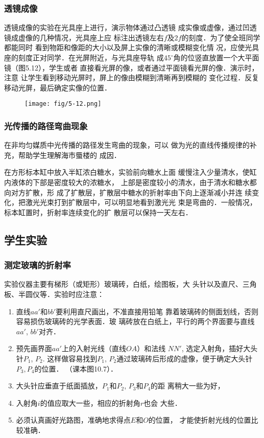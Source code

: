 \subsubsection{透镜成像}
透镜成像的实验在光具座上进行，演示物体通过凸透镜
成实像或虚像，通过凹透镜成虚像的几种情况，光具座上应
标注出透镜左右$f$及$2f$的刻度．为了使全班同学都能同时
看到物距和像距的大小以及屏上实像的清晰或模糊变化情
况，应使光具座的刻度正对同学．在光屏附近，与光具座导轨
成$45^{\circ}$角的位竖直放置一个大平面镜（图5.12），学生或者
直接看光屏的像，或者通过平面镜看光屏的像．演示时，注意
让学生看到移动光屏时，屏上的像由模糊到清晰再到模糊的
变化过程．反复移动光屏，最后确定实像的位置．
\begin{figure}[htp]
    \centering
    \texttt{[image: fig/5-12.png]}
    \caption{}
\end{figure}

\subsubsection{光传播的路径弯曲现象}

在非均匀媒质中光传播的路径发生弯曲的现象，可以
做为光的直线传播规律的补充，帮助学生理解海市蜃楼的
成因．

在方形标本缸中放入半缸浓白糖水，实验前向糖水上面
缓慢注入少量清水，使缸内液体的下部是密度较大的浓糖水，
上部是密度较小的清水，由于清水和糖水都向对方扩散，形
成了扩散层，扩散层中糖水的折射率由下向上逐渐减小并连
续变化，把激光光束打到扩散层中，可以明显地看到激光光
束是弯曲的．一般情况，标本缸置时，折射率连续变化的扩
散层可以保持一天左右．

\subsection{学生实验}
\subsubsection{测定玻璃的折射率}
实验仪器主要有梯形（或矩形）玻璃砖，白纸，绘图板，大
头针以及直尺、三角板、半圆仪等．实验时应注意：
\begin{enumerate}
\item 直线$aa'$和$bb'$要利用直尺画出，不准直接用铅笔
靠着玻璃砖的侧面划线，否则容易损伤玻璃砖的光学表面．玻
璃砖放在白纸上，平行的两个界面要与直线$aa'$, $bb'$对齐．
\item 预先画界面$aa'$上的入射光线（直线$OA$）和法线
$NN'$, 选定入射角，插好大头针$P_1$, $P_2$. 这样做容易找到$P_1$,
$P_2$通过玻璃砖后形成的虚像，便于确定大头针$P_3,P_4$的位置．
（课本图10.7）．
\item 大头针应垂直于纸面插放，$P_1$和$P_2$, $P_3$和$P_4$的距
离稍大一些为好，
\item 入射角$i$的值应取大一些，相应的折射角$r$也会
大些．
\item 必须认真画好光路图，准确地求得点$E$和$O$的位置，
才能使折射光线的位置比较准确．
\end{enumerate}

